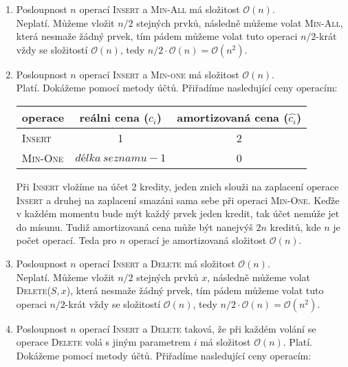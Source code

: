 \documentclass[12pt]{iv003}
\begin{document}
\begin{enumerate}
	\item Posloupnost $n$ operací \textsc{Insert} a \textsc{Min-All} má složitost $\mathcal{O}(n)$.\\
	Neplatí. Můžeme vložit $n/2$ stejných prvků, následně můžeme volat \textsc{Min-All}, která nesmaže žádný prvek, tím pádem můžeme volat tuto operaci $n/2$-krát vždy se složitostí $\mathcal{O}(n)$, tedy $n/2 \cdot \mathcal{O}(n) = \mathcal{O}(n^{2})$. 
	
	\item Posloupnost $n$ operací \textsc{Insert} a \textsc{Min-one} má složitost $\mathcal{O}(n)$.\\
	Platí. Dokážeme pomocí metody účtů. Přiřadíme nasledující ceny operacím:
	\begin{center}
	\begin{tabular}{ l | c | c }
		operace 			&	reálni cena ($c_{i}$)	& 	amortizovaná cena ($\widehat{c_{i}}$) \\ \hline \hline
		\textsc{Insert} 	& 	1						&	2 \\
		\textsc{Min-One}	&	$délka\ seznamu - 1$					&	0 \\ \hline 
	\end{tabular}
	\end{center}
	
	Při \textsc{Insert} vložíme na účet 2 kredity, jeden znich slouži na zaplacení operace \textsc{Insert} a druhej na zaplacení smazáni sama sebe při operaci \textsc{Min-One}. Keďže v každém momentu bude mýt každý prvek jeden kredit, tak účet nemúže jet do mísunu. Tudiž amortizovaná cena může být nanejvýš $2n$ kreditů, kde $n$ je počet operací. Teda pro $n$ operací je amortizovaná složitost $\mathcal{O}(n)$.
	
	\item Posloupnost $n$ operací \textsc{Insert} a \textsc{Delete} má složitost $\mathcal{O}(n)$.\\
	Neplatí. Můžeme vložit $n/2$ stejných prvků $x$, následně můžeme volat \textsc{Delete}($S,x$), která nesmaže žádný prvek, tím pádem můžeme volat tuto operaci $n/2$-krát vždy se složitostí $\mathcal{O}(n)$, tedy $n/2 \cdot \mathcal{O}(n) = \mathcal{O}(n^{2})$. 
	
	\item Posloupnost $n$ operací \textsc{Insert} a \textsc{Delete} taková, že při každém volání se operace \textsc{Delete} volá s jiným parametrem $i$ má složitost $\mathcal{O}(n)$.
	Platí. Dokážeme pomocí metody účtů. Přiřadíme nasledující ceny operacím:
	

\end{enumerate}
\end{document}
